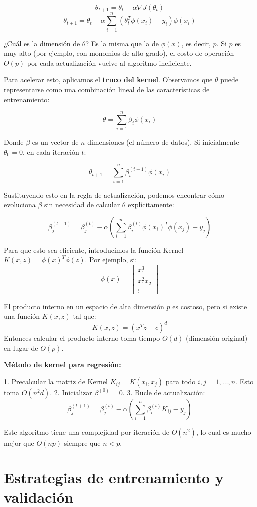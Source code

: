 \[ \theta_{t+1} = \theta_t - \alpha \nabla J(\theta_t) \]
\[ \theta_{t+1} = \theta_t - \alpha \sum_{i=1}^n (\theta_t^T \phi(x_i) - y_i) \phi(x_i) \]

¿Cuál es la dimensión de $\theta$? Es la misma que la de $\phi(x)$, es decir, $p$. Si $p$ es muy alto (por ejemplo, con monomios de alto grado), el costo de operación $O(p)$ por cada actualización vuelve al algoritmo ineficiente. 

Para acelerar esto, aplicamos el \textbf{truco del kernel}. Observamos que $\theta$ puede representarse como una combinación lineal de las características de entrenamiento:

\[ \theta = \sum_{i=1}^n \beta_i \phi(x_i) \]

Donde $\beta$ es un vector de $n$ dimensiones (el número de datos). Si inicialmente $\theta_0 = 0$, en cada iteración $t$:

\[ \theta_{t+1} = \sum_{i=1}^n \beta_i^{(t+1)} \phi(x_i) \]

Sustituyendo esto en la regla de actualización, podemos encontrar cómo evoluciona $\beta$ sin necesidad de calcular $\theta$ explícitamente:

\[ \beta_j^{(t+1)} = \beta_j^{(t)} - \alpha \left( \sum_{i=1}^n \beta_i^{(t)} \phi(x_i)^T \phi(x_j) - y_j \right) \]

Para que esto sea eficiente, introducimos la función Kernel $K(x, z) = \phi(x)^T \phi(z)$. Por ejemplo, si:
\[ \phi(x) = \begin{bmatrix} x_1^3 \\ x_1^2 x_2 \\ \vdots \end{bmatrix} \]

El producto interno en un espacio de alta dimensión $p$ es costoso, pero si existe una función $K(x, z)$ tal que:
\[ K(x, z) = (x^T z + c)^d \]
Entonces calcular el producto interno toma tiempo $O(d)$ (dimensión original) en lugar de $O(p)$.

\textbf{Método de kernel para regresión:}

1. Precalcular la matriz de Kernel $K_{ij} = K(x_i, x_j)$ para todo $i, j = 1, \dots, n$. Esto toma $O(n^2 d)$.
2. Inicializar $\beta^{(0)} = 0$.
3. Bucle de actualización:
\[ \beta_j^{(t+1)} = \beta_j^{(t)} - \alpha \left( \sum_{i=1}^n \beta_i^{(t)} K_{ij} - y_j \right) \]

Este algoritmo tiene una complejidad por iteración de $O(n^2)$, lo cual es mucho mejor que $O(np)$ siempre que $n < p$.


\section{Estrategias de entrenamiento y validación}

